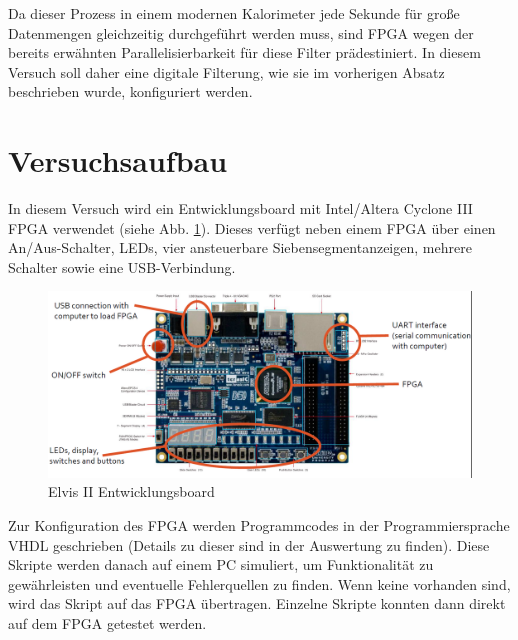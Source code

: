 Da dieser Prozess in einem modernen Kalorimeter jede Sekunde für große Datenmengen gleichzeitig durchgeführt werden muss, sind FPGA wegen der bereits erwähnten Parallelisierbarkeit für diese Filter prädestiniert.
In diesem Versuch soll daher eine digitale Filterung, wie sie im vorherigen Absatz beschrieben wurde, konfiguriert werden.


\section{Versuchsaufbau}
In diesem Versuch wird ein Entwicklungsboard mit Intel/Altera Cyclone III FPGA verwendet (siehe Abb. \ref{board}).
Dieses verfügt neben einem FPGA über einen An/Aus-Schalter, LEDs, vier ansteuerbare Siebensegmentanzeigen, mehrere Schalter sowie eine USB-Verbindung.

\begin{figure}[h]
  \includegraphics[width=\linewidth]{../Daten/board.png}
  \caption{Elvis II Entwicklungsboard}
  \label{board}
\end{figure}

Zur Konfiguration des FPGA werden Programmcodes in der Programmiersprache VHDL geschrieben (Details zu dieser sind in der Auswertung zu finden).
Diese Skripte werden danach auf einem PC simuliert, um Funktionalität zu gewährleisten und eventuelle Fehlerquellen zu finden.
Wenn keine vorhanden sind, wird das Skript auf das FPGA übertragen.
Einzelne Skripte konnten dann direkt auf dem FPGA getestet werden.
